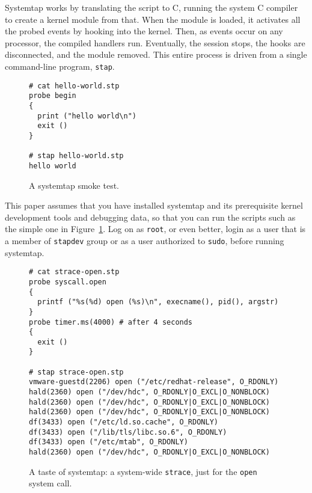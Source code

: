 \documentclass{article}
\newenvironment{boxedminipage}%
    {\begin{makeimage}\begin{center}\begin{Sbox}\begin{minipage}}%
    {\end{minipage}\end{Sbox}\fbox{\TheSbox}\end{center}\end{makeimage}}
\renewcommand{\nomenclature}[2]{}
\begin{document}
Systemtap works by translating the script to C, running the system C
compiler to create a kernel module from that.  When the module is
loaded, it activates all the probed events by hooking into the kernel.
Then, as events occur on any processor, the compiled handlers run.
Eventually, the session stops, the hooks are disconnected, and the
module removed.  This entire process is driven from a single
command-line program, \verb+stap+.

\begin{figure}[!ht]
\begin{boxedminipage}{4.5in}
\begin{verbatim}
# cat hello-world.stp
probe begin 
{
  print ("hello world\n")
  exit ()
}

# stap hello-world.stp
hello world
\end{verbatim}
\end{boxedminipage}
\label{fig:hello-world}
\caption{A systemtap smoke test.}
\end{figure}

This paper assumes that you have installed systemtap and its
prerequisite kernel development tools and debugging data, so that you
can run the scripts such as the simple one in
Figure~\ref{fig:hello-world}.  Log on as \verb+root+, or even better,
login as a user that is a member of \verb+stapdev+ group or as a
user authorized to \verb+sudo+, before running systemtap.

\begin{figure}[ht]
\begin{boxedminipage}{4.5in}
\begin{verbatim}
# cat strace-open.stp
probe syscall.open
{
  printf ("%s(%d) open (%s)\n", execname(), pid(), argstr) 
}
probe timer.ms(4000) # after 4 seconds
{
  exit ()
}

# stap strace-open.stp
vmware-guestd(2206) open ("/etc/redhat-release", O_RDONLY)
hald(2360) open ("/dev/hdc", O_RDONLY|O_EXCL|O_NONBLOCK)
hald(2360) open ("/dev/hdc", O_RDONLY|O_EXCL|O_NONBLOCK)
hald(2360) open ("/dev/hdc", O_RDONLY|O_EXCL|O_NONBLOCK)
df(3433) open ("/etc/ld.so.cache", O_RDONLY)
df(3433) open ("/lib/tls/libc.so.6", O_RDONLY)
df(3433) open ("/etc/mtab", O_RDONLY)
hald(2360) open ("/dev/hdc", O_RDONLY|O_EXCL|O_NONBLOCK)
\end{verbatim}
\end{boxedminipage}
\label{fig:strace-open}
\caption{A taste of systemtap: a system-wide {\tt strace}, just for
the {\tt open} system call.}
\end{figure}
\nomenclature{strace}{A standard ptrace-based command line tool to trace system call activity of a process.}
\end{document}
